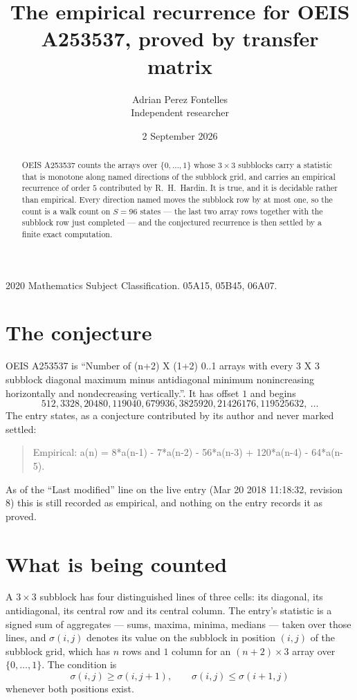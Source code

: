 \documentclass[11pt,a4paper]{article}
\title{The empirical recurrence for OEIS A253537, proved by transfer matrix}
\author{Adrian Perez Fontelles\\ \small Independent researcher}
\date{2 September 2026}
\theoremstyle{plain}
\theoremstyle{definition}
\begin{document}
\maketitle

\begin{abstract}
OEIS A253537 counts the arrays over $\{0,\dots,1\}$ whose $3\times3$ subblocks carry a
statistic that is monotone along named directions of the subblock grid, and carries an
empirical recurrence of order $5$ contributed by R.~H.~Hardin. It is true, and it is
decidable rather than empirical. Every direction named moves the subblock row by at most one,
so the count is a walk count on $S=96$ states --- the last two array rows together with the
subblock row just completed --- and the conjectured recurrence is then settled by a finite
exact computation.
\end{abstract}

\noindent\small 2020 Mathematics Subject Classification. 05A15, 05B45, 06A07.\normalsize

\section{The conjecture}

OEIS A253537 is ``Number of (n+2) X (1+2) 0..1 arrays with every 3 X 3 subblock diagonal maximum minus antidiagonal minimum nonincreasing horizontally and nondecreasing vertically.''. It has offset $1$ and begins
\[
512, 3328, 20480, 119040, 679936, 3825920, 21426176, 119525632,\ \dots
\]
The entry states, as a conjecture contributed by its author and never marked settled:
\begin{quote}
Empirical: a(n) = 8*a(n-1) - 7*a(n-2) - 56*a(n-3) + 120*a(n-4) - 64*a(n-5).
\end{quote}
As of the ``Last modified'' line on the live entry (Mar 20 2018 11:18:32, revision 8) this is still
recorded as empirical, and nothing on the entry records it as proved.

\section{What is being counted}

A $3\times3$ subblock has four distinguished lines of three cells: its diagonal, its
antidiagonal, its central row and its central column. The entry's statistic is a signed sum of
aggregates --- sums, maxima, minima, medians --- taken over those lines, and $\sigma(i,j)$
denotes its value on the subblock in position $(i,j)$ of the subblock grid, which has $n$ rows
and $1$ column for an $(n+2)\times3$ array over $\{0,\dots,1\}$. The condition is
\[
\sigma(i,j)\ge\sigma(i,j+1),\qquad \sigma(i,j)\le\sigma(i+1,j)
\]
whenever both positions exist.
\end{document}
